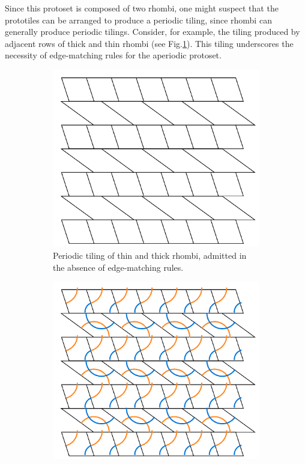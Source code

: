 \documentclass[
  oneside,
  11pt, a4paper,
  footinclude=true,
  headinclude=true,
  cleardoublepage=empty
]{scrbook}
\begin{document}
Since this protoset is composed of two rhombi, one might suspect that the prototiles can be arranged to produce a periodic tiling, since rhombi can generally produce periodic tilings. Consider, for example, the tiling produced by adjacent rows of thick and thin rhombi (see Fig.\ref{fig:RhombsPeriodic}). This tiling underscores the necessity of edge-matching rules for the aperiodic protoset. 
\begin{figure}[H]
\begin{subfigure}[t]{0.45\textwidth}
\centering
\includegraphics[width=\textwidth]{RhombPeriodic}
\caption{Periodic tiling of thin and thick rhombi, admitted in the absence of edge-matching rules.}
\label{fig:RhombsPeriodic}
\end{subfigure}\hfill
\begin{subfigure}[t]{0.45\textwidth}
\centering
\includegraphics[width=\textwidth]{RhombPeriodicRules}

\end{subfigure}
\end{figure}
\end{document}
